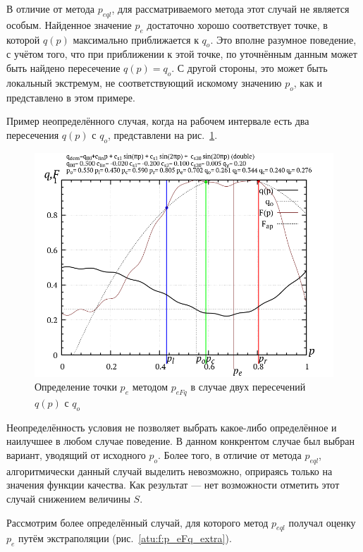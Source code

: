 В отличие от метода $p_{eql}$, для рассматриваемого метода
этот случай не является особым. Найденное значение $p_e$
достаточно хорошо соответствует точке, в которой
$q(p)$ максимально приближается к $q_o$. Это вполне разумное поведение,
с учётом того, что при приближении к этой точке, по уточнённым данным
может быть найдено пересечение $q(p) = q_o$. С другой стороны,
это может быть локальный экстремум, не соответствующий искомому значению $p_o$,
как и представлено в этом примере.

Пример неопределённого случая, когда на рабочем интервале есть
два пересечения $q(p)$ с $q_o$, представлени на рис.~\ref{atu:f:p_eFq_double}.

\begin{figure}[htb!]
  \centerline{\includegraphics[width=60\TW]{p/p_eFq/q_p_eFq_double.png}}
  \caption{Определение точки $p_e$ методом $p_{eFq}$ в случае двух пересечений $q(p)$ с $q_o$ }
  \label{atu:f:p_eFq_double}
\end{figure}

Неопределённость условия не позволяет выбрать какое-либо определённое и
наилучшее в любом случае поведение. В данном конкрентом случае
был выбран вариант, уводящий от исходного $p_o$.
Более того, в отличие от метода $p_{eql}$,
алгоритмически данный случай выделить невозможно, оприраясь только на значения
функции качества. Как результат --- нет возможности отметить этот случай снижением
величины $S$.

Рассмотрим более определённый случай, для которого метод $p_{eql}$
получал оценку $p_e$ путём экстраполяции (рис.~\ref{atu:f:p_eFq_extra}).

